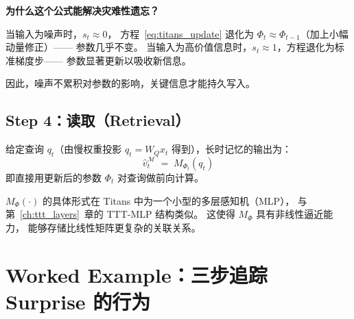 \textbf{为什么这个公式能解决灾难性遗忘？}

当输入为噪声时，$s_t \approx 0$，
方程~\eqref{eq:titans_update} 退化为 $\Phi_t \approx \Phi_{t-1}$（加上小幅动量修正）——
参数几乎不变。
当输入为高价值信息时，$s_t \approx 1$，方程退化为标准梯度步——
参数显著更新以吸收新信息。

因此，噪声不累积对参数的影响，关键信息才能持久写入。

\subsection*{Step 4：读取（Retrieval）}

给定查询 $q_t$（由慢权重投影 $q_t = W_Q x_t$ 得到），长时记忆的输出为：
\begin{equation}
  \hat{v}_t^{\mathcal{M}} \;=\; M_{\Phi_t}(q_t)
  \label{eq:titans_read}
\end{equation}
即直接用更新后的参数 $\Phi_t$ 对查询做前向计算。

\begin{remark}
$M_{\Phi}(\cdot)$ 的具体形式在 Titans 中为一个小型的多层感知机（MLP），
与第~\ref{ch:ttt_layers}~章的 TTT-MLP 结构类似。
这使得 $M_{\Phi}$ 具有非线性逼近能力，
能够存储比线性矩阵更复杂的关联关系。
\end{remark}

\section{Worked Example：三步追踪 Surprise 的行为}
\label{sec:titans_worked}

